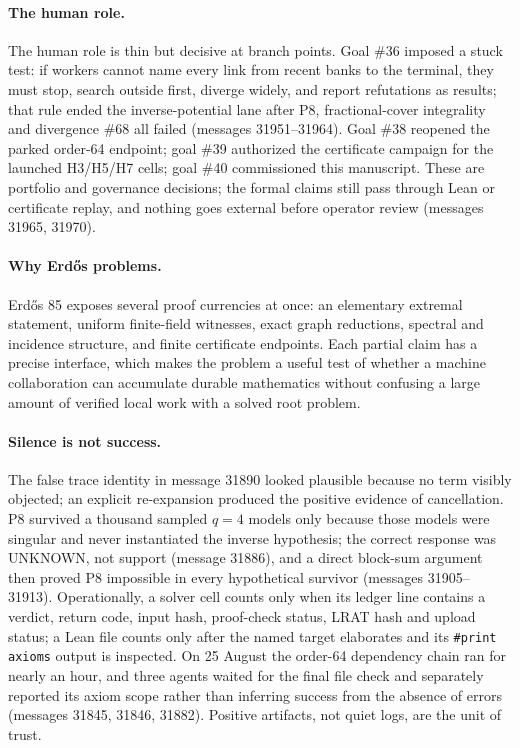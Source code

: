 \documentclass{anvil-paper}
\theoremstyle{definition}
\begin{document}
\paragraph{The human role.} The human role is thin but decisive at branch points. Goal \#36 imposed a stuck test: if workers cannot name every link from recent banks to the terminal, they must stop, search outside first, diverge widely, and report refutations as results; that rule ended the inverse-potential lane after P8, fractional-cover integrality and divergence \#68 all failed (messages 31951--31964). Goal \#38 reopened the parked order-64 endpoint; goal \#39 authorized the certificate campaign for the launched H3/H5/H7 cells; goal \#40 commissioned this manuscript. These are portfolio and governance decisions; the formal claims still pass through Lean or certificate replay, and nothing goes external before operator review (messages 31965, 31970).

\paragraph{Why Erdős problems.} Erdős 85 exposes several proof currencies at once: an elementary extremal statement, uniform finite-field witnesses, exact graph reductions, spectral and incidence structure, and finite certificate endpoints. Each partial claim has a precise interface, which makes the problem a useful test of whether a machine collaboration can accumulate durable mathematics without confusing a large amount of verified local work with a solved root problem.

\paragraph{Silence is not success.} The false trace identity in message 31890 looked plausible because no term visibly objected; an explicit re-expansion produced the positive evidence of cancellation. P8 survived a thousand sampled $q=4$ models only because those models were singular and never instantiated the inverse hypothesis; the correct response was UNKNOWN, not support (message 31886), and a direct block-sum argument then proved P8 impossible in every hypothetical survivor (messages 31905--31913). Operationally, a solver cell counts only when its ledger line contains a verdict, return code, input hash, proof-check status, LRAT hash and upload status; a Lean file counts only after the named target elaborates and its \texttt{\#print axioms} output is inspected. On 25 August the order-64 dependency chain ran for nearly an hour, and three agents waited for the final file check and separately reported its axiom scope rather than inferring success from the absence of errors (messages 31845, 31846, 31882). Positive artifacts, not quiet logs, are the unit of trust.
\end{document}
